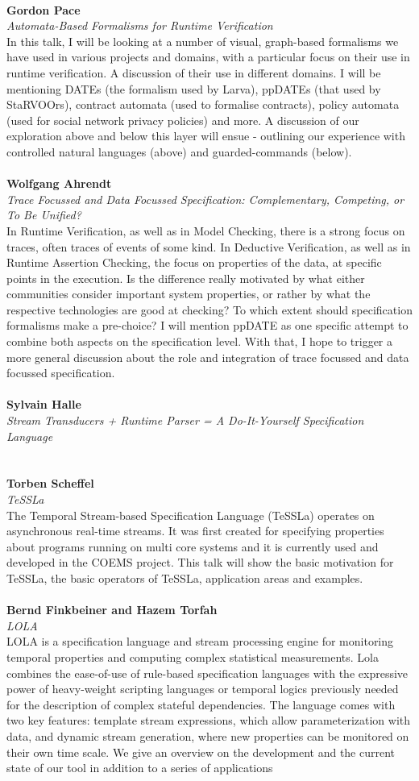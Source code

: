 \documentclass{article}
\newcounter{talkc}
\newcommand{\talk}[3]{\stepcounter{talkc}
\vspace{0.5em}~\\
\noindent
\textbf{#1}\\ 
\noindent\emph{#2}\\ 
\noindent#3\\
}
\begin{document}
%
%
\talk{Gordon Pace}{Automata-Based Formalisms for Runtime Verification}{In this talk, I will be looking at a number of visual, graph-based formalisms we have used in various projects and domains, with a particular focus on their use in runtime verification. A discussion of their use in different domains. I will be mentioning DATEs (the formalism used by Larva), ppDATEs (that used by StaRVOOrs), contract automata (used to formalise contracts), policy automata (used for social network privacy policies) and more. A discussion of our exploration above and below this layer will ensue - outlining our experience with controlled natural languages (above) and guarded-commands (below).}
%
\talk{Wolfgang Ahrendt}{Trace Focussed and Data Focussed Specification: Complementary, Competing, or To Be Unified?}{In Runtime Verification, as well as in Model Checking, there is a strong focus on traces, often traces of events of some kind. In Deductive Verification, as well as in Runtime Assertion Checking, the focus on properties of the data, at specific points in the execution. Is the difference really motivated by what either communities consider important system properties, or rather by what the respective technologies are good at checking? To which extent should specification formalisms make a pre-choice? I will mention ppDATE as one specific attempt to combine both aspects on the specification level. With that, I hope to trigger a more general discussion about the role and integration of trace focussed and data focussed specification.}
%
\talk{Sylvain Halle}{Stream Transducers + Runtime Parser = A Do-It-Yourself Specification Language}{}
%
\talk{Torben Scheffel}{TeSSLa}{The Temporal Stream-based Specification Language (TeSSLa) operates on asynchronous real-time streams. It was first created for specifying properties about programs running on multi core systems and it is currently used and developed in the COEMS project. This talk will show the basic motivation for TeSSLa, the basic operators of TeSSLa, application areas and examples.}
%
\talk{Bernd Finkbeiner and Hazem Torfah}{LOLA}{LOLA is a specification language and stream processing engine for monitoring temporal properties and computing complex statistical measurements. Lola combines the ease-of-use of rule-based specification languages with the expressive power of heavy-weight scripting languages or temporal logics previously needed for the description of complex stateful dependencies. The language comes with two key features: template stream expressions, which allow parameterization with data, and dynamic stream generation, where new properties can be monitored on their own time scale. We give an overview on the development and the current state of our tool in addition to a series of applications}
\end{document}
